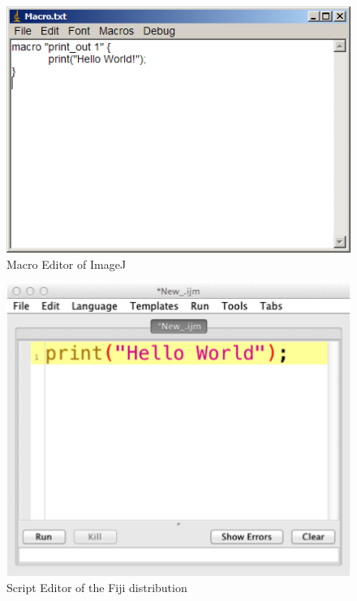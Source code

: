 \documentclass[11pt,a4paper,oneside]{report}
\begin{document}

%


\begin{figure}[htbp]
\begin{center}
\includegraphics[scale=0.6]{fig/editor_helloworld_IJ.png}
\caption{Macro Editor of ImageJ} \label{fig_MacroEditor}
\end{center}
\end{figure}

\begin{figure}[hbtp]
\begin{center}
\includegraphics[scale=1.0]{fig/editor_helloworld_singleline.png}
\caption{Script Editor of the Fiji distribution} \label{fig_ScriptEditor}
\end{center}
\end{figure}
\end{document}
